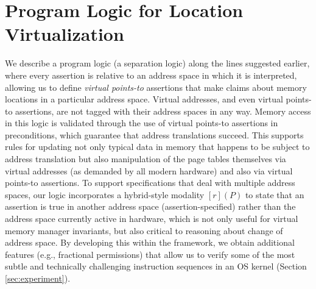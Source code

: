 \section{Program Logic for Location Virtualization}
\label{sec:logic}
\newcommand{\gammaPred}{\delta}
\newcommand{\gammaPreds}{\delta\textsf{s}}
\newcommand{\rtv}{\textsf{rtv}}
\newcommand{\qone}{\texttt{q1}}
\newcommand{\qtwo}{\texttt{q2}}
\newcommand{\qthree}{\texttt{q3}}
\newcommand{\qfour}{\texttt{q4}}

\newcommand{\sumwalkabs}[3]{
  \ownGhost\gammaPred{\authfrag{\singletonMap{#1}{(#2, #3)}}}
}

\newcommand{\sumapaces}[2]{
  \ownGhost\gammaPreds{\authfrag{\singletonMap{#1}{#2}}}
}
\newcommand{\ptableabswalk}[1]{\mathcal{A}\textsf{bsPTableWalk}(#1)}
\newcommand{\ptablestore}{\theta}

We describe a program logic (a separation logic) along the lines suggested earlier, where every assertion is relative
to an address space in which it is interpreted, allowing us to define \emph{virtual points-to} assertions that make claims
about memory locations in a particular address space. Virtual addresses, and even virtual points-to assertions, 
are not tagged with their address spaces in any way. Memory access in this logic is validated through the use
of virtual points-to assertions in preconditions, which guarantee that address translations succeed.
This supports rules for updating not only typical data in memory that happens to be subject to address translation but also
manipulation of the page tables themselves via virtual addresses (as demanded by all modern hardware) and also
via virtual points-to assertions.
To support specifications that deal with multiple address spaces, our logic incorporates a hybrid-style modality
$[r](P)$ to state that an assertion is true in another address space (assertion-specified) rather than the address space
currently active in hardware, which is not only useful for virtual memory manager invariants, but also critical to reasoning
about change of address space.
By developing this within the \iris framework, we obtain additional features (e.g., fractional permissions) that allow us to verify
some of the most subtle and technically challenging instruction sequences in an OS kernel (Section \ref{sec:experiment}).


